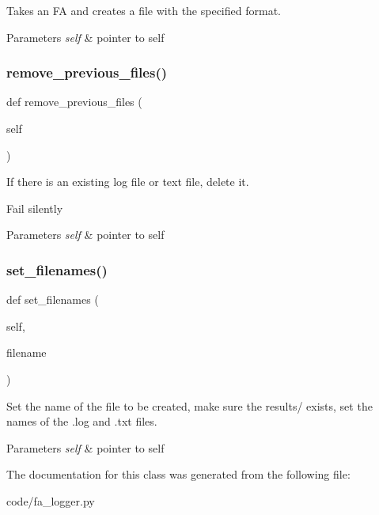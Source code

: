 Takes an FA and creates a file with the specified format. 


\begin{DoxyParams}{Parameters}
{\em self} & pointer to self \\
\hline
\end{DoxyParams}
\mbox{\label{classfa__logger_1_1_f_a___logger_a1946635ab60794dcc17d9f394f043b9b}} 
\subsubsection{\texorpdfstring{remove\+\_\+previous\+\_\+files()}{remove\_previous\_files()}}
{\footnotesize\ttfamily def remove\+\_\+previous\+\_\+files (\begin{DoxyParamCaption}\item[{}]{self }\end{DoxyParamCaption})}



If there is an existing log file or text file, delete it. 

Fail silently 
\begin{DoxyParams}{Parameters}
{\em self} & pointer to self \\
\hline
\end{DoxyParams}
\mbox{\label{classfa__logger_1_1_f_a___logger_a0d497d461f3694c2cb33d896dc333192}} 
\subsubsection{\texorpdfstring{set\+\_\+filenames()}{set\_filenames()}}
{\footnotesize\ttfamily def set\+\_\+filenames (\begin{DoxyParamCaption}\item[{}]{self,  }\item[{}]{filename }\end{DoxyParamCaption})}



Set the name of the file to be created, make sure the results/ exists, set the names of the .log and .txt files. 


\begin{DoxyParams}{Parameters}
{\em self} & pointer to self \\
\hline
\end{DoxyParams}


The documentation for this class was generated from the following file\+:\begin{DoxyCompactItemize}
\item 
code/fa\+\_\+logger.\+py\end{DoxyCompactItemize}
